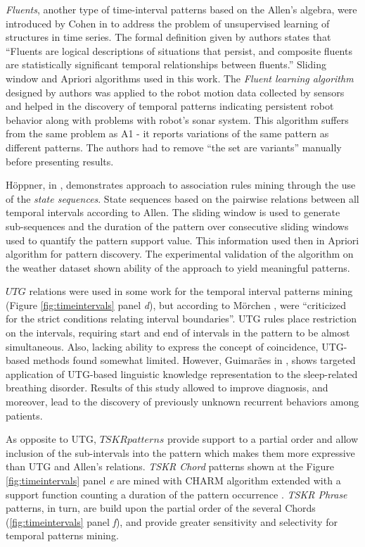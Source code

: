 \textit{Fluents}, another type of time-interval patterns based on the Allen's algebra, were introduced by Cohen in \cite{citeulike:5153756} to address the problem of unsupervised learning of structures in time series. The formal definition given by authors states that ``Fluents are logical descriptions of situations that persist, and composite fluents are statistically significant temporal relationships between fluents.'' Sliding window and Apriori algorithms used in this work. The \textit{Fluent learning algorithm} designed by authors was applied to the robot motion data collected by sensors and helped in the discovery of temporal patterns indicating persistent robot behavior along with problems with robot's sonar system. This algorithm suffers from the same problem as A1 - it reports variations of the same pattern as different patterns. The authors had to remove ``the set are variants'' manually before presenting results.

H\"{o}ppner, in \cite{citeulike:5159615}, demonstrates approach to association rules mining through the use of the \textit{state sequences}. State sequences based on the pairwise relations between all temporal intervals according to Allen. The sliding window is used to generate sub-sequences and the duration of the pattern over consecutive sliding windows used to quantify the pattern support value. This information used then in Apriori algorithm for pattern discovery. The experimental validation of the algorithm on the weather dataset shown ability of the approach to yield meaningful patterns.

$UTG$ relations were used in some work for the temporal interval patterns mining (Figure \ref{fig:timeintervals} panel \textit{d}), but according to M\"orchen \cite{citeulike:1748833}, were ``criticized for the strict conditions relating interval boundaries''. UTG rules place restriction on the intervals, requiring start and end of intervals in the pattern to be almost simultaneous. Also, lacking ability to express the concept of coincidence, UTG-based methods found somewhat limited. However, Guimar\~{a}es in \cite{citeulike:5159924}, shows targeted application of UTG-based linguistic knowledge representation to the sleep-related breathing disorder. Results of this study  allowed to improve diagnosis, and moreover, lead to the discovery of previously unknown recurrent behaviors among patients.

As opposite to UTG, $TSKR patterns$ provide support to a partial order and allow inclusion of the sub-intervals into the pattern which makes them more expressive than UTG and Allen's relations. \textit{TSKR Chord} patterns shown at the Figure \ref{fig:timeintervals} panel \textit{e} are mined with CHARM \cite{citeulike:769773} algorithm extended with a support function counting a duration of the pattern occurrence \cite{citeulike:1748833}. \textit{TSKR Phrase} patterns, in turn, are build upon the partial order of the several Chords (\ref{fig:timeintervals} panel \textit{f}), and provide greater sensitivity and selectivity for temporal patterns mining.
